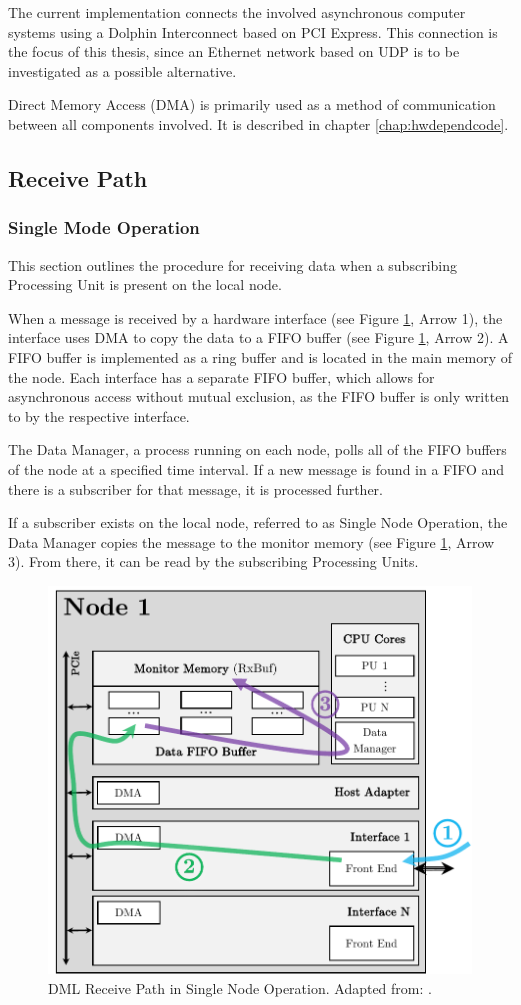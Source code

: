 The current implementation connects the involved asynchronous computer systems using a Dolphin Interconnect based on PCI Express. This connection is the focus of this thesis, since an Ethernet network based on UDP is to be investigated as a possible alternative.

Direct Memory Access (DMA) is primarily used as a method of communication between all components involved. It is described in chapter \ref{chap:hwdependcode}.

\subsection{Receive Path}

\subsubsection{Single Mode Operation}
This section outlines the procedure for receiving data when a subscribing Processing Unit is present on the local node.

When a message is received by a hardware interface (see Figure \ref{fig:DmlRecSingleNode}, Arrow 1), the interface uses DMA to copy the data to a FIFO buffer (see Figure \ref{fig:DmlRecSingleNode}, Arrow 2). A FIFO buffer is implemented as a ring buffer and is located in the main memory of the node. Each interface has a separate FIFO buffer, which allows for asynchronous access without mutual exclusion, as the FIFO buffer is only written to by the respective interface.

The Data Manager, a process running on each node, polls all of the FIFO buffers of the node at a specified time interval. If a new message is found in a FIFO and there is a subscriber for that message, it is processed further.

If a subscriber exists on the local node, referred to as Single Node Operation, the Data Manager copies the message to the monitor memory (see Figure \ref{fig:DmlRecSingleNode}, Arrow 3). From there, it can be read by the subscribing Processing Units. \\

\begin{figure}[h!]
    \centering
    \includegraphics[width=0.48\linewidth]{figures/dml/dml02a.pdf}
    \caption[DML Receive Path in Single Node Operation]{DML Receive Path in Single Node Operation. Adapted from: \cite{dml01}.}
    \label{fig:DmlRecSingleNode}
\end{figure}

